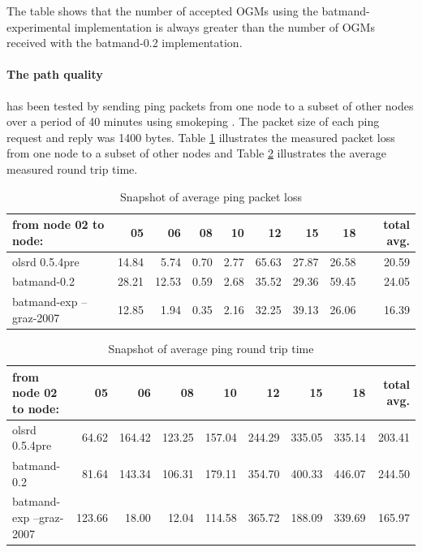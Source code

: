\documentclass[11pt]{article}
\begin{document}
The table shows that the number of accepted OGMs using the batmand-experimental implementation is always greater than the number of OGMs received with the batmand-0.2 implementation.

\paragraph{The path quality} has been tested by sending ping packets from one node to a subset of other nodes over a period of 40 minutes using smokeping \cite{smokeping}. The packet size of each ping request and reply was 1400 bytes. Table \ref{tab:ping-loss} illustrates the measured packet loss from one node to a subset of other nodes and Table \ref{tab:ping-delay} illustrates the average measured round trip time.


\begin{table}[htb]
\begin{center}
\begin{tabular}{|l|rrrrrrr|r|}
\hline
from node 02 to node:   & 05    & 06    & 08   & 10   & 12    & 15    & 18    & total avg. \\
\hline
olsrd 0.5.4pre		& 14.84 & 5.74  & 0.70 & 2.77 & 65.63 & 27.87 & 26.58 & 20.59 \\
batmand-0.2		& 28.21 & 12.53 & 0.59 & 2.68 & 35.52 & 29.36 & 59.45 & 24.05 \\
batmand-exp --graz-2007	& 12.85 & 1.94  & 0.35 & 2.16 & 32.25 & 39.13 & 26.06 & 16.39 \\
\hline
\end{tabular}
\caption{Snapshot of average ping packet loss}
\label{tab:ping-loss}
\end{center}
\end{table}%

\begin{table}[htb]
\begin{center}
\begin{tabular}{|l|rrrrrrr|r|}
\hline
from node 02 to node:   & 05    & 06    & 08   & 10   & 12    & 15    & 18    & total avg. \\
\hline
olsrd 0.5.4pre		&  64.62 & 164.42 & 123.25 & 157.04 & 244.29 & 335.05 & 335.14 & 203.41 \\
batmand-0.2		&  81.64 & 143.34 & 106.31 & 179.11 & 354.70 & 400.33 & 446.07 & 244.50 \\
batmand-exp --graz-2007	& 123.66 &  18.00 &  12.04 & 114.58 & 365.72 & 188.09 & 339.69 & 165.97 \\
\hline
\end{tabular}
\caption{Snapshot of average ping round trip time}
\label{tab:ping-delay}
\end{center}
\end{table}%
\end{document}
